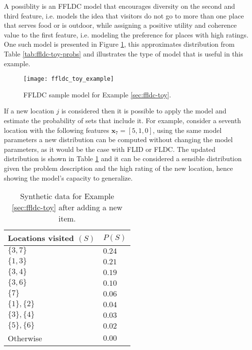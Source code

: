 A possiblity is an FFLDC model that encourages diversity on the second and third feature, i.e. models the idea that visitors do not go to more than one place that serves food or is outdoor, while assigning a positive utility and coherence value to the first feature, i.e. modeling the preference for places with high ratings. One such model is presented in Figure \ref{fig:ffldc-toy-all-weights}, this approximates distribution from Table \ref{tab:ffldc-toy-probs} and illustrates the type of model that is useful in this example.

\begin{figure}
  \centering
  \texttt{[image: ffldc\_toy\_example]}
  \caption{FFLDC sample model for Example \ref{sec:ffldc-toy}.}
  \label{fig:ffldc-toy-all-weights}
\end{figure}

If a new location $j$ is considered then it is possible to apply the model and estimate the probability of sets that include it. For example, consider a seventh location with the following features $\mathbf{x}_{7} = [5, 1, 0]$, using the same model parameters a new distribution can be computed without changing the model parameters, as it would be the case with FLID or FLDC. The updated distribution is shown in Table \ref{tab:ffldc-toy-probs-2} and it can be considered a sensible distribution given the problem description and the high rating of the new location, hence showing the model's capacity to generalize.

\begin{table}
  \centering
  \caption{Synthetic data for Example \ref{sec:ffldc-toy} after adding a new item.}
  \begin{tabular}{@{}ll@{}}
    \toprule
    Locations visited $(S)$ & $P(S)$  \\
    \midrule
    $\{3,7\}$ & $0.24$ \\
    $\{1,3\}$ & $0.21$ \\
    $\{3,4\}$ & $0.19$ \\
    $\{3,6\}$ & $0.10$ \\
    $\{7\}$ & $0.06$ \\
    $\{1\}, \{2\}$ & $0.04$ \\ 
    $\{3\}, \{4\}$ & $0.03$ \\
    $\{5\}, \{6\}$ & $0.02$ \\
    Otherwise & $0.00$ \\
    \bottomrule
  \end{tabular}
  \label{tab:ffldc-toy-probs-2}
\end{table}